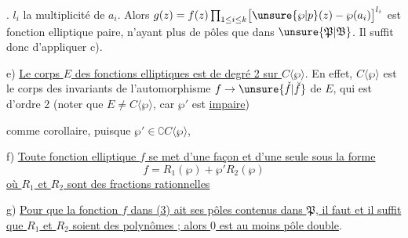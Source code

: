 . $l_i$ la multiplicité de $a_i$. Alors $g(z)=f(z)\prod_{1\leq i\leq k}\bigl[\unsure{\wp|p}(z)-\wp(a_i)\bigr]^{l_i}$ est fonction elliptique paire, n'ayant plus de pôles que dans $\unsure{\mathfrak P|\mathfrak B}$. Il suffit donc d'appliquer c).


e) \uline{Le corps $E$ des fonctions elliptiques est de degré 2 sur $C\langle\wp\rangle$}. En effet, $C\langle\wp\rangle$ est le corps des invariants de l'automorphisme $f\to\unsure{\check f|\breve f}$ de $E$, qui est d'ordre 2 (noter que $E\ne C\langle\wp\rangle$, car $\wp'$ est \uline{impaire})

comme corollaire, puisque $\wp'\in\complement C\langle\wp\rangle$,

f) \uline{Toute fonction elliptique $f$ se met d'une façon et d'une seule sous la forme}
\[
f=R_1(\wp)+\wp'R_2(\wp)\tag*{(3)}
\]
\uline{où $R_1$ et $R_2$ sont des fractions rationnelles}

 

g)  \uline{Pour que la fonction $f$ dans (3) ait ses pôles contenus dans $\mathfrak P$, il faut et il suffit que $R_1$ et $R_2$ soient des polynômes ; alors $0$ est au moins pôle double}.


